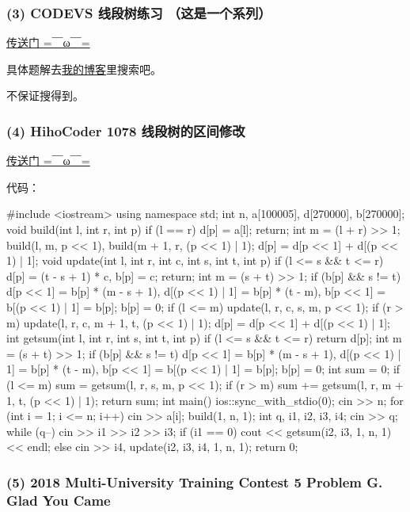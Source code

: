 \subsubsection{(3) CODEVS 线段树练习 （这是一个系列）}

\href{http://codevs.cn/problem/?q=\%E7%BA%BF%E6%AE%B5%E6%A0%91%E7%BB%83%E4%B9%A0}{传送门 =￣ω￣=}

具体题解去\href{https://www.k-xzy.xyz/}{我的博客}里搜索吧。

不保证搜得到。

\subsubsection{(4) HihoCoder 1078 线段树的区间修改}

\href{https://cn.vjudge.net/problem/HihoCoder-1078}{传送门 =￣ω￣=}

代码：

\begin{cppcode}
#include <iostream>
using namespace std;
int n, a[100005], d[270000], b[270000];
void build(int l, int r, int p) {
  if (l == r) {
    d[p] = a[l];
    return;
  }
  int m = (l + r) >> 1;
  build(l, m, p << 1), build(m + 1, r, (p << 1) | 1);
  d[p] = d[p << 1] + d[(p << 1) | 1];
}
void update(int l, int r, int c, int s, int t, int p) {
  if (l <= s && t <= r) {
    d[p] = (t - s + 1) * c, b[p] = c;
    return;
  }
  int m = (s + t) >> 1;
  if (b[p] && s != t)
    d[p << 1] = b[p] * (m - s + 1), d[(p << 1) | 1] = b[p] * (t - m),
           b[p << 1] = b[(p << 1) | 1] = b[p];
  b[p] = 0;
  if (l <= m) update(l, r, c, s, m, p << 1);
  if (r > m) update(l, r, c, m + 1, t, (p << 1) | 1);
  d[p] = d[p << 1] + d[(p << 1) | 1];
}
int getsum(int l, int r, int s, int t, int p) {
  if (l <= s && t <= r) return d[p];
  int m = (s + t) >> 1;
  if (b[p] && s != t)
    d[p << 1] = b[p] * (m - s + 1), d[(p << 1) | 1] = b[p] * (t - m),
           b[p << 1] = b[(p << 1) | 1] = b[p];
  b[p] = 0;
  int sum = 0;
  if (l <= m) sum = getsum(l, r, s, m, p << 1);
  if (r > m) sum += getsum(l, r, m + 1, t, (p << 1) | 1);
  return sum;
}
int main() {
  ios::sync_with_stdio(0);
  cin >> n;
  for (int i = 1; i <= n; i++) cin >> a[i];
  build(1, n, 1);
  int q, i1, i2, i3, i4;
  cin >> q;
  while (q--) {
    cin >> i1 >> i2 >> i3;
    if (i1 == 0)
      cout << getsum(i2, i3, 1, n, 1) << endl;
    else
      cin >> i4, update(i2, i3, i4, 1, n, 1);
  }
  return 0;
}
\end{cppcode}

\subsubsection{(5) 2018 Multi-University Training Contest 5 Problem G. Glad You Came}

